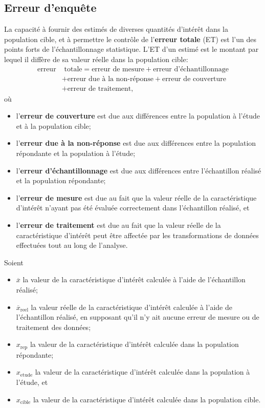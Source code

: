 \subsection{Erreur d'enquête} La capacité à fournir des estimés de diverses quantités d'intérêt dans la population cible, et à permettre le contrôle de l'\textbf{erreur totale} (ET) est l'un des points forts de l'échantillonnage statistique. L'ET d'un estimé est le montant par lequel il diffère de sa valeur réelle dans la population cible:
\begin{align*} 
\text{erreur}&\text{\ totale}  =  \text{erreur\ de\ mesure}  +  \text{erreur\ d'échantillonnage} \\ & +  \text{erreur\ due\ à la non-réponse} +  \text{erreur\ de\ couverture} \\ & + \text{erreur de traitement}, \end{align*}
o\`u 
\begin{itemize}[noitemsep]
\item l'\textbf{erreur de couverture} est due aux différences entre la population à l'étude et à la population cible; 
\item l'\textbf{erreur due \`a la non-r\'eponse} est due aux diff\'erences entre la population r\'epondante et la population \`a l'\'etude;
\item l'\textbf{erreur d'\'echantillonnage} est due aux diff\'erences entre l'\'echantillon r\'ealis\'e et la population r\'epondante; 
\item l'\textbf{erreur de mesure} est due au fait que la valeur réelle de la caract\'eristique d'int\'er\^et n'ayant pas \'et\'e évaluée correctement dans l'\'echantillon r\'ealis\'e, et 
\item l'\textbf{erreur de traitement} est due au fait que la valeur réelle de la caract\'eristique d'int\'er\^et peut \^etre affect\'ee par les transformations de donn\'ees effectu\'ees tout au long de l'analyse. 
\end{itemize}
Soient
\begin{itemize}[noitemsep]
\item $\overline{x}$ la valeur de la caractéristique d'intérêt calculée à l'aide de l'échantillon réalisé; 
\item $\overline{x}_{\mathrm{reel}}$ la valeur r\'eelle de la caractéristique d'intérêt calculée à l'aide de l'échantillon réalisé, en supposant qu'il n'y ait aucune erreur de mesure ou de traitement des donn\'ees; 
\item $x_{\mathrm{rep}}$ la valeur de la caractéristique d'intérêt calculée dans la population r\'epondante;
\item $x_{\mathrm{etude}}$ la valeur de la caractéristique d'intérêt calculée dans la population à l'étude, et 
\item $x_{\mathrm{cible}}$ la valeur de la caractéristique d'intérêt calculée dans la population cible.
\end{itemize}
